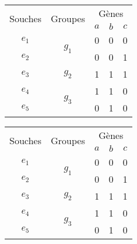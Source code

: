  
	\begin{overprint}%
		{
			\begin{minipage}[l]{0.46\linewidth}
				\begin{center}
					\begin{tabular}{|c||c|c|c|c|}
						\hline
						\multirow{2}{*}{Souches}&\multirow{2}{*}{Groupes}&\multicolumn{3}{c|}{Gènes
						}\\
						&&$a$&$b$&$c$\\
						\hline
						\hline
						$e_1$&\multirow{2}{*}{$g_1$}& 0 & 0 & 0\\
						\cline{1-1} \cline{3-5}
						$e_2$&& 0 & 0 & 1\\
						\hline
						\hline
						$e_3$&$g_2$& 1 &  1 & 1\\
						\hline
						\hline
						$e_4$&\multirow{2}{*}{$g_3$}& 1 & 1 & 0\\
						\cline{1-1} \cline{3-5}
						$e_5$&& 0 & 1 & 0\\
						\hline
					\end{tabular}
				\end{center}
			\end{minipage}
			\hspace{0.4cm}
			\begin{minipage}[r]{0.46\linewidth}
			\end{minipage}
		}
		{
			\begin{minipage}[l]{0.46\linewidth}
				\begin{center}
					\begin{tabular}{|c||c|c|c|c|}
						\hline
						\multirow{2}{*}{Souches}&\multirow{2}{*}{Groupes}&\multicolumn{3}{c|}{Gènes
						}\\
						&&$a$&$b$&$c$\\
						\hline
						\hline
						$e_1$&\multirow{2}{*}{$g_1$}& 0 & 0 & 0\\
						\cline{1-1} \cline{3-5}
						$e_2$&& 0 & 0 & 1\\
						\hline
						\hline
						$e_3$&$g_2$& 1 &  1 & 1\\
						\hline
						\hline
						$e_4$&\multirow{2}{*}{$g_3$}& 1 & 1 & 0\\
						\cline{1-1} \cline{3-5}
						$e_5$&& 0 & 1 & 0\\
						\hline
					\end{tabular}
				\end{center}
			\end{minipage}
			\hspace{0.4cm}
}
\end{overprint}
